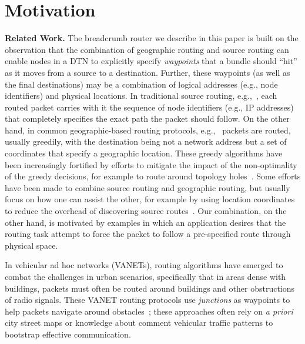 \section{Motivation}
{\bf Related Work.}
The {\sc breadcrumb} router we describe in this paper is built on the observation that the combination of geographic routing and source routing can enable nodes in a DTN to explicitly specify {\em waypoints} that a bundle should ``hit'' as it moves from a source to a destination. Further, these waypoints (as well as the final destinations) may be a combination of logical addresses (e.g., node identifiers) and physical locations. In traditional source routing, e.g.,~\cite{johnson96:dynamic}, each routed packet carries with it the sequence of node identifiers (e.g., IP addresses) that completely specifies the exact path the packet should follow. On the other hand, in common geographic-based routing protocols, e.g.,~\cite{florian13:overdrive, karp00:gpsr, navas97:geocast} packets are routed, usually greedily, with the destination being not a network address but a set of coordinates that specify a geographic location. These greedy algorithms have been increasingly fortified by efforts to mitigate the impact of the non-optimality of the greedy decisions, for example to route around topology holes~\cite{tian03:spatially}. Some efforts have been made to combine source routing and geographic routing, but usually focus on how one can assist the other, for example by using location coordinates to reduce the overhead of discovering source routes~\cite{basagni99:dynamic}. Our combination, on the other hand, is motivated by examples in which an application desires that the routing task attempt to force the packet to follow a pre-specified route through physical space.

In vehicular ad hoc networks (VANETs), routing algorithms have emerged to combat the challenges in urban scenarios, specifically that in areas dense with buildings, packets must often be routed around buildings and other obstructions of radio signals. These VANET routing protocols use {\em junctions} as waypoints to help packets navigate around obstacles~\cite{jerbi07:improved, lochert05:geographic}; these approaches often rely on {\em a priori} city street maps or knowledge about comment vehicular traffic patterns to bootstrap effective communication.

